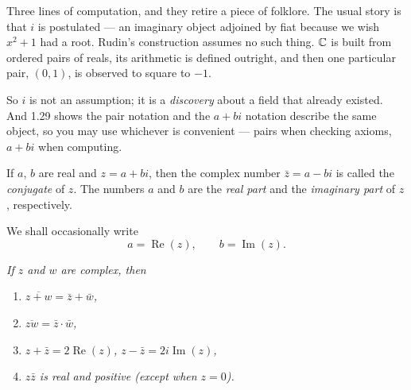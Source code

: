 \begin{unpack}
Three lines of computation, and they retire a piece of folklore. The usual story
is that $i$ is postulated --- an imaginary object adjoined by fiat because we
wish $x^2+1$ had a root. Rudin's construction assumes no such thing. $\mathbb{C}$ is
built from ordered pairs of reals, its arithmetic is defined outright, and then
one particular pair, $(0,1)$, is observed to square to $-1$.

So $i$ is not an assumption; it is a \emph{discovery} about a field that already
existed. And 1.29 shows the pair notation and the $a+bi$ notation describe the
same object, so you may use whichever is convenient --- pairs when checking
axioms, $a+bi$ when computing.
\end{unpack}

If $a$, $b$ are real and $z = a+bi$, then the complex number $\bar z = a-bi$ is
called the \emph{conjugate} of $z$. The numbers $a$ and $b$ are the \emph{real
part} and the \emph{imaginary part} of $z$, respectively.

We shall occasionally write
\[ a = \operatorname{Re}(z), \qquad b = \operatorname{Im}(z). \]

\begin{center}
\end{center}

\emph{If $z$ and $w$ are complex, then}
\begin{enumerate}[label=(\alph*), leftmargin=2.2em, itemsep=1pt, topsep=3pt]
  \item \emph{$\overline{z+w} = \bar z + \bar w$,}
  \item \emph{$\overline{zw} = \bar z \cdot \bar w$,}
  \item \emph{$z + \bar z = 2\operatorname{Re}(z)$,
        $z - \bar z = 2i\operatorname{Im}(z)$,}
  \item \emph{$z\bar z$ is real and positive (except when $z = 0$).}
\end{enumerate}

